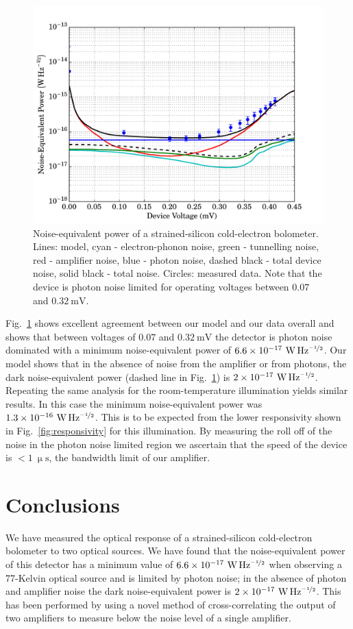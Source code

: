 \documentclass[journal, a4paper]{IEEEtran}
\begin{document}
\begin{figure}[tb]
\begin{center}
\includegraphics[width=0.9\columnwidth]{noiseModel}
\caption{Noise-equivalent power of a strained-silicon cold-electron bolometer. Lines: model, cyan - electron-phonon noise, green - tunnelling noise, red - amplifier noise, blue - photon noise, dashed black - total device noise, solid black - total noise. Circles: measured data. Note that the device is photon noise limited for operating voltages between $0.07$ and $0.32~\mathrm{mV}$.}
\label{fig:NEP}
\end{center}
\end{figure}
\par 
Fig.~\ref{fig:NEP} shows excellent agreement between our model and our data overall and shows that between voltages of $0.07$ and $0.32~\mathrm{mV}$ the detector is photon noise dominated with a minimum noise-equivalent power of $6.6 \times 10^{-17}~\mathrm{W\,Hz^{\nicefrac{-1}{2}}}$. Our model shows that in the absence of noise from the amplifier or from photons, the dark noise-equivalent power (dashed line in Fig.~\ref{fig:NEP}) is $2 \times 10^{-17}~\mathrm{W\,Hz^{\nicefrac{-1}{2}}}$. Repeating the same analysis for the room-temperature illumination yields similar results. In this case the minimum noise-equivalent power was $1.3 \times 10^{-16}~\mathrm{W\,Hz^{\nicefrac{-1}{2}}}$. This is to be expected from the lower responsivity shown in Fig.~\ref{fig:responsivity} for this illumination.
By measuring the roll off of the noise in the photon noise limited region we ascertain that the speed of the device is $<1~\mathrm{\upmu s}$, the bandwidth limit of our amplifier.
%
\newpage
\section{Conclusions}
We have measured the optical response of a strained-silicon cold-electron bolometer to two optical sources. We have found that the noise-equivalent power of this detector has a minimum value of $6.6 \times 10^{-17}~\mathrm{W\,Hz^{\nicefrac{-1}{2}}}$ when observing a 77-Kelvin optical source and is limited by photon noise; in the absence of photon and amplifier noise the dark noise-equivalent power is $2 \times 10^{-17}~\mathrm{W\,Hz^{\nicefrac{-1}{2}}}$. This has been performed by using a novel method of cross-correlating the output of two amplifiers to measure below the noise level of a single amplifier.
%
\end{document}

